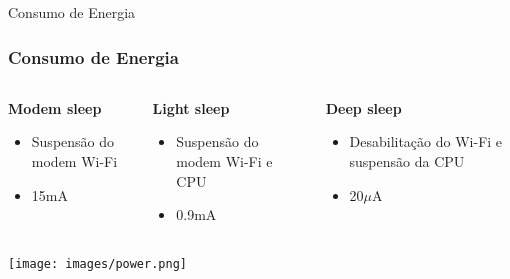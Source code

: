 \documentclass[10pt, compress]{beamer}
\begin{document}
\begin{frame}{Consumo de Energia}
  \frametitle{Consumo de Energia}

    \begin{columns}
      \begin{column}{0.38\textwidth}
        \begin{center}
          \textbf{Modem sleep}
            \begin{itemize}
              \item Suspensão do modem Wi-Fi
              \item 15mA
            \end{itemize}
        \end{center}
      \end{column}
      \begin{column}{0.38\textwidth}
        \begin{center}
          \textbf{Light sleep}
            \begin{itemize}
              \item Suspensão do modem Wi-Fi e CPU
              \item 0.9mA
            \end{itemize}
        \end{center}
      \end{column}
      \begin{column}{0.38\textwidth}
        \begin{center}
          \textbf{Deep sleep}
            \begin{itemize}
              \item Desabilitação do Wi-Fi e suspensão da CPU
              \item 20$\mu$A
            \end{itemize}
        \end{center}
      \end{column}
    \end{columns}
    \begin{center}
      \vspace{20pt}
      \texttt{[image: images/power.png]}\\
    \end{center}
\end{frame}
\end{document}
